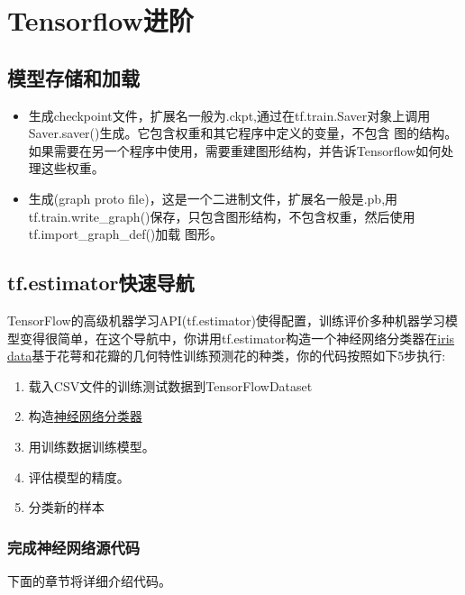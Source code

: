 \chapter{Tensorflow进阶}
\section{模型存储和加载}
\begin{itemize}
\item 生成checkpoint文件，扩展名一般为.ckpt,通过在tf.train.Saver对象上调用Saver.saver()生成。它包含权重和其它程序中定义的变量，不包含
图的结构。如果需要在另一个程序中使用，需要重建图形结构，并告诉Tensorflow如何处理这些权重。
\item 生成(graph proto file)，这是一个二进制文件，扩展名一般是.pb,用tf.train.write\_graph()保存，只包含图形结构，不包含权重，然后使用tf.import\_graph\_def()加载
图形。
\end{itemize}
\section{tf.estimator快速导航}
TensorFlow的高级机器学习API(tf.estimator)使得配置，训练评价多种机器学习模型变得很简单，在这个导航中，你讲用tf.estimator构造一个神经网络分类器在\href{https://en.wikipedia.org/wiki/Iris_flower_data_set}{iris data}基于花萼和花瓣的几何特性训练预测花的种类，你的代码按照如下5步执行:
\begin{enumerate}
    \item 载入CSV文件的训练测试数据到TensorFlowDataset
    \item 构造\href{https://www.tensorflow.org/api_docs/python/tf/estimator/DNNClassifier}{神经网络分类器}
    \item 用训练数据训练模型。
    \item 评估模型的精度。
    \item 分类新的样本
\end{enumerate}
\subsection{完成神经网络源代码}

下面的章节将详细介绍代码。
